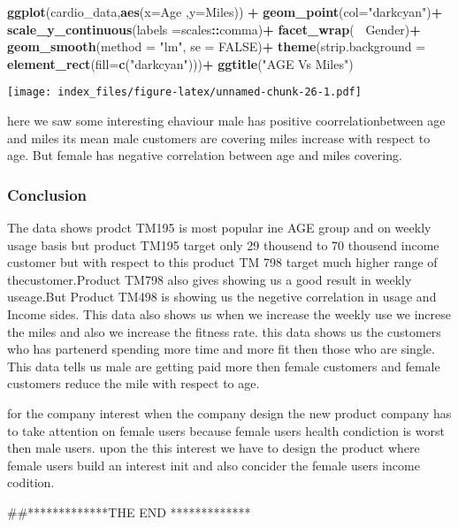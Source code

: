 \documentclass[
]{article}
\newenvironment{Shaded}{\begin{snugshade}}{\end{snugshade}}
\newcommand{\DataTypeTok}[1]{\textcolor[rgb]{0.13,0.29,0.53}{#1}}
\newcommand{\KeywordTok}[1]{\textcolor[rgb]{0.13,0.29,0.53}{\textbf{#1}}}
\newcommand{\NormalTok}[1]{#1}
\newcommand{\OperatorTok}[1]{\textcolor[rgb]{0.81,0.36,0.00}{\textbf{#1}}}
\newcommand{\OtherTok}[1]{\textcolor[rgb]{0.56,0.35,0.01}{#1}}
\newcommand{\StringTok}[1]{\textcolor[rgb]{0.31,0.60,0.02}{#1}}
\begin{document}
\begin{Shaded}
\begin{Highlighting}[]
\KeywordTok{ggplot}\NormalTok{(cardio_data,}\KeywordTok{aes}\NormalTok{(}\DataTypeTok{x=}\NormalTok{Age ,}\DataTypeTok{y=}\NormalTok{Miles)) }\OperatorTok{+}
\StringTok{  }\KeywordTok{geom_point}\NormalTok{(}\DataTypeTok{col=}\StringTok{"darkcyan"}\NormalTok{)}\OperatorTok{+}
\StringTok{  }\KeywordTok{scale_y_continuous}\NormalTok{(}\DataTypeTok{labels =}\NormalTok{scales}\OperatorTok{::}\NormalTok{comma)}\OperatorTok{+}
\StringTok{  }\KeywordTok{facet_wrap}\NormalTok{(}\OperatorTok{~}\StringTok{ }\NormalTok{Gender)}\OperatorTok{+}
\StringTok{  }\KeywordTok{geom_smooth}\NormalTok{(}\DataTypeTok{method =} \StringTok{"lm"}\NormalTok{, }\DataTypeTok{se =} \OtherTok{FALSE}\NormalTok{)}\OperatorTok{+}
\StringTok{  }\KeywordTok{theme}\NormalTok{(}\DataTypeTok{strip.background =} \KeywordTok{element_rect}\NormalTok{(}\DataTypeTok{fill=}\KeywordTok{c}\NormalTok{(}\StringTok{"darkcyan"}\NormalTok{)))}\OperatorTok{+}
\StringTok{  }\KeywordTok{ggtitle}\NormalTok{(}\StringTok{"AGE Vs Miles"}\NormalTok{)}
\end{Highlighting}
\end{Shaded}

\texttt{[image: index\_files/figure-latex/unnamed-chunk-26-1.pdf]}

here we saw some interesting ehaviour male has positive
coorrelationbetween age and miles its mean male customers are covering
miles increase with respect to age. But female has negative correlation
between age and miles covering.

\hypertarget{conclusion}{%
\subsubsection{Conclusion}\label{conclusion}}

The data shows prodct TM195 is most popular ine AGE group and on weekly
usage basis but product TM195 target only 29 thousend to 70 thousend
income customer but with respect to this product TM 798 target much
higher range of thecustomer.Product TM798 also gives showing us a good
result in weekly useage.But Product TM498 is showing us the negetive
correlation in usage and Income sides. This data also shows us when we
increase the weekly use we increse the miles and also we increase the
fitness rate. this data shows us the customers who has partenerd
spending more time and more fit then those who are single. This data
tells us male are getting paid more then female customers and female
customers reduce the mile with respect to age.

for the company interest when the company design the new product company
has to take attention on female users because female users health
condiction is worst then male users. upon the this interest we have to
design the product where female users build an interest init and also
concider the female users income codition.

\#\#*************THE END *************
\end{document}
